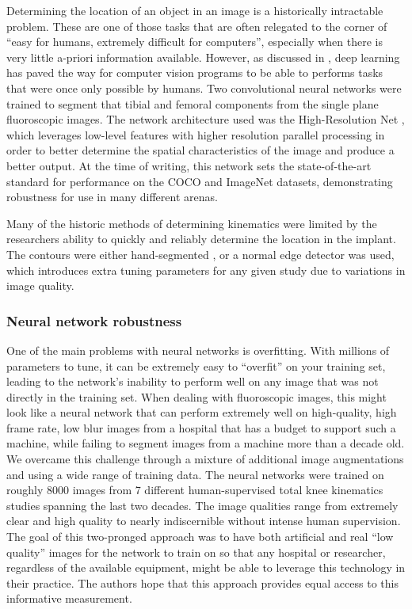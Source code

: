 Determining the location of an object in an image is a historically intractable problem. These are one of those tasks that are often relegated to the corner of ``easy for humans, extremely difficult for computers'', especially when there is very little a-priori information available. However, as discussed in , deep learning has paved the way for computer vision programs to be able to performs tasks that were once only possible by humans. Two convolutional neural networks were trained to segment that tibial and femoral components from the single plane fluoroscopic images. The network architecture used was the High-Resolution Net \cite{wangDeepHighResolutionRepresentation2020}, which leverages low-level features with higher resolution parallel processing in order to better determine the spatial characteristics of the image and produce a better output. At the time of writing, this network sets the state-of-the-art standard for performance on the COCO and ImageNet datasets, demonstrating robustness for use in many different arenas.

Many of the historic methods of determining kinematics were limited by the researchers ability to quickly and reliably determine the location in the implant. The contours were either hand-segmented \cite{banksAccurateMeasurementThreedimensional1996, zuffiModelbasedMethodReconstruction1999}, or a normal edge detector was used, which introduces extra tuning parameters for any given study due to variations in image quality.


\subsubsection{Neural network robustness}
One of the main problems with neural networks is overfitting. With millions of parameters to tune, it can be extremely easy to ``overfit'' on your training set, leading to the network's inability to perform well on any image that was not directly in the training set. When dealing with fluoroscopic images, this might look like a neural network that can perform extremely well on high-quality, high frame rate, low blur images from a hospital that has a budget to support such a machine, while failing to segment images from a machine more than a decade old. We overcame this challenge through a mixture of additional image augmentations \cite{buslaevAlbumentationsFastFlexible2020} and using a wide range of training data. The neural networks were trained on roughly 8000 images from 7 different human-supervised total knee kinematics studies spanning the last two decades. The image qualities range from extremely clear and high quality to nearly indiscernible without intense human supervision. The goal of this two-pronged approach was to have both artificial and real ``low quality'' images for the network to train on so that any hospital or researcher, regardless of the available equipment, might be able to leverage this technology in their practice. The authors hope that this approach provides equal access to this informative measurement.
